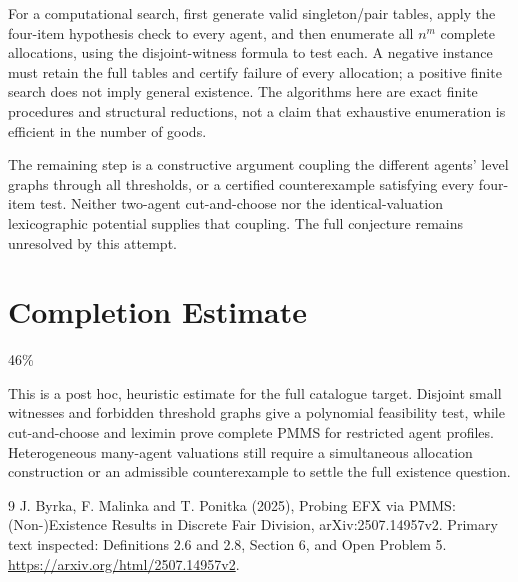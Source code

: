 \documentclass[11pt]{article}
\begin{document}
For a computational search, first generate valid singleton/pair tables, apply the four-item hypothesis check to every agent, and then enumerate all $n^m$ complete allocations, using the disjoint-witness formula to test each. A negative instance must retain the full tables and certify failure of every allocation; a positive finite search does not imply general existence. The algorithms here are exact finite procedures and structural reductions, not a claim that exhaustive enumeration is efficient in the number of goods.

The remaining step is a constructive argument coupling the different agents' level graphs through all thresholds, or a certified counterexample satisfying every four-item test. Neither two-agent cut-and-choose nor the identical-valuation lexicographic potential supplies that coupling. The full conjecture remains unresolved by this attempt.

\section{Completion Estimate}
46\%

This is a post hoc, heuristic estimate for the full catalogue target.
Disjoint small witnesses and forbidden threshold graphs give a polynomial feasibility test, while cut-and-choose and leximin prove complete PMMS for restricted agent profiles. Heterogeneous many-agent valuations still require a simultaneous allocation construction or an admissible counterexample to settle the full existence question.

\begin{thebibliography}{9}
 J. Byrka, F. Malinka and T. Ponitka (2025), Probing EFX via PMMS: (Non-)Existence Results in Discrete Fair Division, arXiv:2507.14957v2. Primary text inspected: Definitions 2.6 and 2.8, Section 6, and Open Problem 5. \url{https://arxiv.org/html/2507.14957v2}.
\end{thebibliography}
\end{document}
